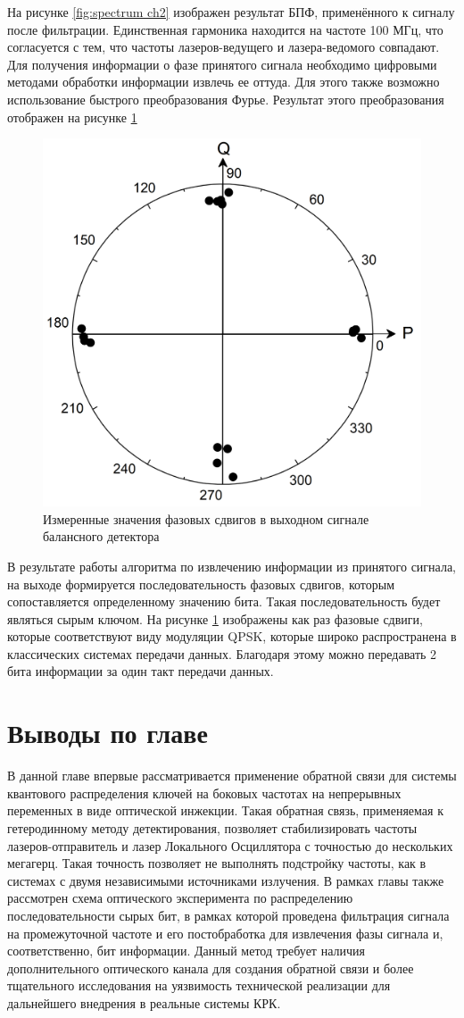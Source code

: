 На рисунке \ref{fig:spectrum ch2} изображен результат БПФ, применённого к сигналу после фильтрации. Единственная гармоника находится на частоте 100 МГц, что согласуется с тем, что частоты лазеров-ведущего и лазера-ведомого совпадают.
Для получения информации о фазе принятого сигнала необходимо цифровыми методами обработки информации извлечь ее оттуда. Для этого также возможно использование быстрого преобразования Фурье. Результат этого преобразования отображен на рисунке \ref{fig:phase meas ch2} 
\begin{figure}
    \centering
    \includegraphics[width=0.7\linewidth]{images/06.png}
    \caption{Измеренные значения фазовых сдвигов в выходном сигнале балансного детектора}
    \label{fig:phase meas ch2}
\end{figure}
В результате работы алгоритма по извлечению информации из принятого сигнала, на выходе формируется последовательность фазовых сдвигов, которым сопоставляется определенному значению бита. Такая последовательность будет являться сырым ключом. На рисунке \ref{fig:phase meas ch2} изображены как раз фазовые сдвиги, которые соответствуют виду модуляции QPSK, которые широко распространена в классических системах передачи данных.
Благодаря этому можно передавать 2 бита информации за один такт передачи данных. 

\section{Выводы по главе}\label{sec:ch2/sect8}
В данной главе впервые рассматривается применение обратной связи для системы квантового распределения ключей на боковых частотах на непрерывных переменных в виде оптической инжекции. Такая обратная связь, применяемая к гетеродинному методу детектирования, позволяет стабилизировать частоты лазеров-отправитель и лазер Локального Осциллятора с точностью до нескольких мегагерц.
Такая точность позволяет не выполнять подстройку частоты, как в системах с двумя независимыми источниками излучения. В рамках главы также рассмотрен схема оптического эксперимента по распределению последовательности сырых бит, в рамках которой проведена фильтрация сигнала на промежуточной частоте и его постобработка для извлечения фазы сигнала и, соответственно, бит информации.
Данный метод требует наличия дополнительного оптического канала для создания обратной связи и более тщательного исследования на уязвимость технической реализации для дальнейшего внедрения в реальные системы КРК.
